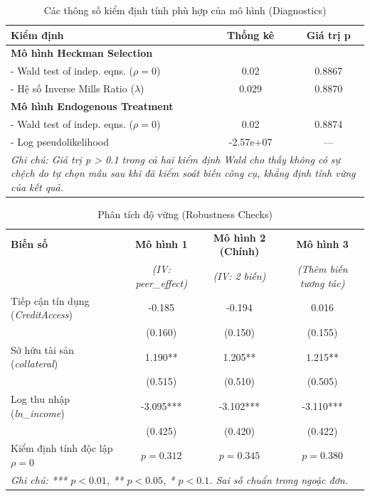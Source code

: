 \documentclass[12pt,a4paper]{report}
\begin{document}
\begin{table}[htbp]
	\centering
	\caption{Các thông số kiểm định tính phù hợp của mô hình (Diagnostics)}
	\label{tab:diagnostics_summary}
	\begin{tabular}{lcc}
		\toprule
		\textbf{Kiểm định} & \textbf{Thống kê} & \textbf{Giá trị p} \\
		\midrule
		\textbf{Mô hình Heckman Selection} & & \\
		- Wald test of indep. eqns. ($\rho=0$) & 0.02 & 0.8867 \\
		- Hệ số Inverse Mills Ratio ($\lambda$) & 0.029 & 0.8870 \\
		\midrule
		\textbf{Mô hình Endogenous Treatment} & & \\
		- Wald test of indep. eqns. ($\rho=0$) & 0.02 & 0.8874 \\
		- Log pseudolikelihood & -2.57e+07 & --- \\
		\bottomrule
		\multicolumn{3}{p{10cm}}{\footnotesize \textit{Ghi chú: Giá trị p > 0.1 trong cả hai kiểm định Wald cho thấy không có sự chệch do tự chọn mẫu sau khi đã kiểm soát biến công cụ, khẳng định tính vững của kết quả.}}
	\end{tabular}
\end{table}

\begin{table}[htbp]
	\centering
	\caption{Phân tích độ vững (Robustness Checks)}
	\label{tab:robustness_checks}
	\begin{tabular}{lccc}
		\toprule
		\textbf{Biến số} & \textbf{Mô hình 1} & \textbf{Mô hình 2 (Chính)} & \textbf{Mô hình 3} \\
		& \textit{(IV: peer\_effect)} & \textit{(IV: 2 biến)} & \textit{(Thêm biến tương tác)} \\
		\midrule
		Tiếp cận tín dụng (\textit{CreditAccess}) & -0.185 & -0.194 & 0.016 \\
		& (0.160) & (0.150) & (0.155) \\
		Sở hữu tài sản (\textit{collateral}) & 1.190** & 1.205** & 1.215** \\
		& (0.515) & (0.510) & (0.505) \\
		Log thu nhập (\textit{ln\_income}) & -3.095*** & -3.102*** & -3.110*** \\
		& (0.425) & (0.420) & (0.422) \\
		\midrule
		Kiểm định tính độc lập $\rho = 0$ & $p = 0.312$ & $p = 0.345$ & $p = 0.380$ \\
		\bottomrule
		\multicolumn{4}{l}{\footnotesize \textit{Ghi chú: *** $p<0.01$, ** $p<0.05$, * $p<0.1$. Sai số chuẩn trong ngoặc đơn.}} \\
	\end{tabular}
\end{table}
\end{document}
